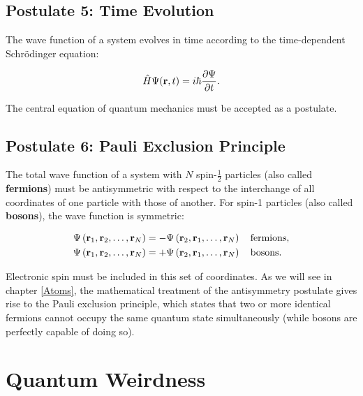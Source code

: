 \documentclass[
  9pt,
]{extbook}
\theoremstyle{definition}
\theoremstyle{definition}
\theoremstyle{definition}
\theoremstyle{remark}
\begin{document}
\hypertarget{postulate-5-time-evolution}{%
\section{Postulate 5: Time Evolution}\label{postulate-5-time-evolution}}

The wave function of a system evolves in time according to the time-dependent Schrödinger equation:

\begin{equation}
\hat{H} \Psi({\bf r}, t) = i \hbar \frac{\partial \Psi}{\partial t}.
\label{eq:post5}  
\end{equation}

The central equation of quantum mechanics must be accepted as a postulate.

\hypertarget{postulate-6-pauli-exclusion-principle}{%
\section{Postulate 6: Pauli Exclusion Principle}\label{postulate-6-pauli-exclusion-principle}}

The total wave function of a system with \(N\) spin-\(\frac{1}{2}\) particles (also called \textbf{fermions}) must be antisymmetric with respect to the interchange of all coordinates of one particle with those of another. For spin-1 particles (also called \textbf{bosons}), the wave function is symmetric:

\begin{equation}
\begin{aligned}
\Psi\left({\bf r}_1,{\bf r}_2,\ldots, {\bf r}_N\right) &= - \Psi\left({\bf r}_2,{\bf r}_1,\ldots, {\bf r}_N\right) \quad \text{fermions}, \\
\Psi\left({\bf r}_1,{\bf r}_2,\ldots, {\bf r}_N\right) &= + \Psi\left({\bf r}_2,{\bf r}_1,\ldots, {\bf r}_N\right) \quad \text{bosons}.
\end{aligned}
\label{eq:post6}  
\end{equation}

Electronic spin must be included in this set of coordinates. As we will see in chapter \ref{Atoms}, the mathematical treatment of the antisymmetry postulate gives rise to the Pauli exclusion principle, which states that two or more identical fermions cannot occupy the same quantum state simultaneously (while bosons are perfectly capable of doing so).

\hypertarget{Weirdness}{%
\chapter{Quantum Weirdness}\label{Weirdness}}
\end{document}
